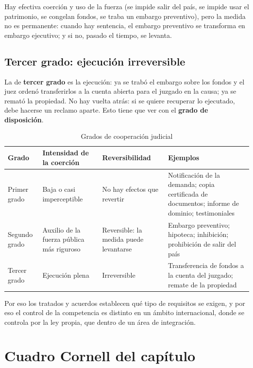 \documentclass[12pt,oneside]{book}
\begin{document}
Hay efectiva coerción y uso de la fuerza (se impide salir del país, se impide usar el patrimonio, se congelan fondos, se traba un embargo preventivo), pero la medida no es permanente: cuando hay sentencia, el embargo preventivo se transforma en embargo ejecutivo; y si no, pasado el tiempo, se levanta.

\subsection{Tercer grado: ejecución irreversible}

La de \textbf{tercer grado} es la ejecución: ya se trabó el embargo sobre los fondos y el juez ordenó transferirlos a la cuenta abierta para el juzgado en la causa; ya se remató la propiedad. No hay vuelta atrás: si se quiere recuperar lo ejecutado, debe hacerse un reclamo aparte. Esto tiene que ver con el \textbf{grado de disposición}.

\begin{table}[H]
\centering
\caption{Grados de cooperación judicial}
\small
\begin{tabularx}{\textwidth}{>{\raggedright\arraybackslash}p{}YYY}
\toprule
\textbf{Grado} & \textbf{Intensidad de la coerción} & \textbf{Reversibilidad} & \textbf{Ejemplos} \\
\midrule
Primer grado & Baja o casi imperceptible & No hay efectos que revertir & Notificación de la demanda; copia certificada de documentos; informe de dominio; testimoniales \\
Segundo grado & Auxilio de la fuerza pública más riguroso & Reversible: la medida puede levantarse & Embargo preventivo; hipoteca; inhibición; prohibición de salir del país \\
Tercer grado & Ejecución plena & Irreversible & Transferencia de fondos a la cuenta del juzgado; remate de la propiedad \\
\bottomrule
\end{tabularx}
\end{table}

Por eso los tratados y acuerdos establecen qué tipo de requisitos se exigen, y por eso el control de la competencia es distinto en un ámbito internacional, donde se controla por la ley propia, que dentro de un área de integración.

\section{Cuadro Cornell del capítulo}
\end{document}
